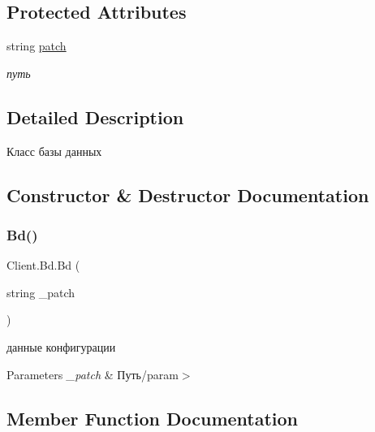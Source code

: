 \subsection*{Protected Attributes}
\begin{DoxyCompactItemize}
\item 
string \hyperlink{class_client_1_1_bd_a4fff732ae82883ee9238243620430c41}{patch}
\begin{DoxyCompactList}\small\item\em путь \end{DoxyCompactList}\end{DoxyCompactItemize}


\subsection{Detailed Description}
Класс базы данных 



\subsection{Constructor \& Destructor Documentation}
\hypertarget{class_client_1_1_bd_a66346f172528dd64f567b7687afb1a33}{}\label{class_client_1_1_bd_a66346f172528dd64f567b7687afb1a33} 
\subsubsection{\texorpdfstring{Bd()}{Bd()}}
{\footnotesize\ttfamily Client.\+Bd.\+Bd (\begin{DoxyParamCaption}\item[{string}]{\+\_\+patch }\end{DoxyParamCaption})\hspace{0.3cm}{\ttfamily [inline]}}



данные конфигурации 


\begin{DoxyParams}{Parameters}
{\em \+\_\+patch} & Путь/param$>$ \\
\hline
\end{DoxyParams}


\subsection{Member Function Documentation}
\hypertarget{class_client_1_1_bd_ad4e3f2477942897e846e3cf247419518}{}\label{class_client_1_1_bd_ad4e3f2477942897e846e3cf247419518} 
